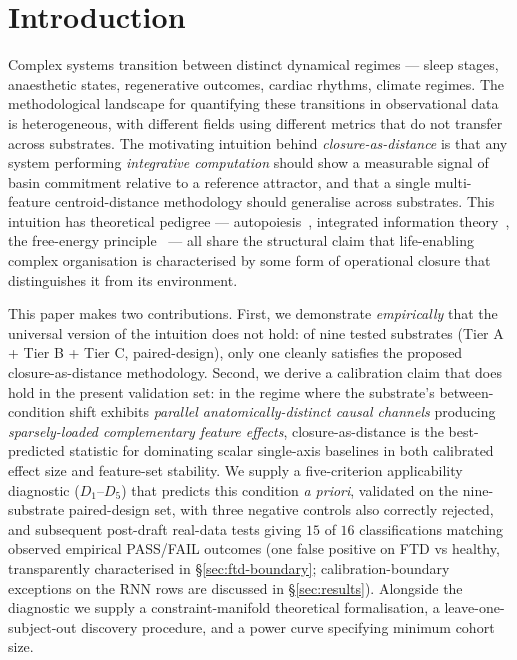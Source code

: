 \documentclass[11pt,a4paper]{article}
\begin{document}
\section{Introduction}\label{sec:intro}

Complex systems transition between distinct dynamical regimes --- sleep stages, anaesthetic states, regenerative outcomes, cardiac rhythms, climate regimes. The methodological landscape for quantifying these transitions in observational data is heterogeneous, with different fields using different metrics that do not transfer across substrates. The motivating intuition behind \emph{closure-as-distance} is that any system performing \emph{integrative computation} should show a measurable signal of basin commitment relative to a reference attractor, and that a single multi-feature centroid-distance methodology should generalise across substrates. This intuition has theoretical pedigree --- autopoiesis~\citep{maturana1980autopoiesis}, integrated information theory~\citep{tononi2016integrated}, the free-energy principle~\citep{friston2010free} --- all share the structural claim that life-enabling complex organisation is characterised by some form of operational closure that distinguishes it from its environment.

This paper makes two contributions. First, we demonstrate \emph{empirically} that the universal version of the intuition does not hold: of nine tested substrates (Tier A + Tier B + Tier C, paired-design), only one cleanly satisfies the proposed closure-as-distance methodology. Second, we derive a calibration claim that does hold in the present validation set: in the regime where the substrate's between-condition shift exhibits \emph{parallel anatomically-distinct causal channels} producing \emph{sparsely-loaded complementary feature effects}, closure-as-distance is the best-predicted statistic for dominating scalar single-axis baselines in both calibrated effect size and feature-set stability. We supply a five-criterion applicability diagnostic ($D_1$--$D_5$) that predicts this condition \emph{a priori}, validated on the nine-substrate paired-design set, with three negative controls also correctly rejected, and subsequent post-draft real-data tests giving $15$ of $16$ classifications matching observed empirical PASS/FAIL outcomes (one false positive on FTD vs healthy, transparently characterised in \S\ref{sec:ftd-boundary}; calibration-boundary exceptions on the RNN rows are discussed in \S\ref{sec:results}). Alongside the diagnostic we supply a constraint-manifold theoretical formalisation, a leave-one-subject-out discovery procedure, and a power curve specifying minimum cohort size.
\end{document}
